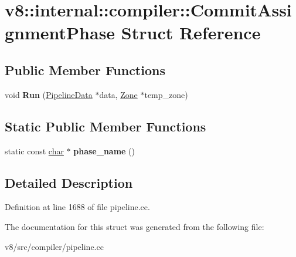 \hypertarget{structv8_1_1internal_1_1compiler_1_1CommitAssignmentPhase}{}\section{v8\+:\+:internal\+:\+:compiler\+:\+:Commit\+Assignment\+Phase Struct Reference}
\label{structv8_1_1internal_1_1compiler_1_1CommitAssignmentPhase}
\subsection*{Public Member Functions}
\begin{DoxyCompactItemize}
\item 
\mbox{\label{structv8_1_1internal_1_1compiler_1_1CommitAssignmentPhase_ab53dce69b74e2081c80b7a60c5bc6a43}} 
void {\bfseries Run} (\mbox{\hyperlink{classv8_1_1internal_1_1compiler_1_1PipelineData}{Pipeline\+Data}} $\ast$data, \mbox{\hyperlink{classv8_1_1internal_1_1Zone}{Zone}} $\ast$temp\+\_\+zone)
\end{DoxyCompactItemize}
\subsection*{Static Public Member Functions}
\begin{DoxyCompactItemize}
\item 
\mbox{\label{structv8_1_1internal_1_1compiler_1_1CommitAssignmentPhase_ad23bdb79c9f63ae11051db9cee0ad565}} 
static const \mbox{\hyperlink{classchar}{char}} $\ast$ {\bfseries phase\+\_\+name} ()
\end{DoxyCompactItemize}


\subsection{Detailed Description}


Definition at line 1688 of file pipeline.\+cc.



The documentation for this struct was generated from the following file\+:\begin{DoxyCompactItemize}
\item 
v8/src/compiler/pipeline.\+cc\end{DoxyCompactItemize}
